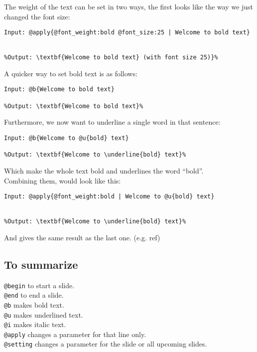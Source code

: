 The weight of the text can be set in two ways, the first looks like the way we just changed the font size: \\

\begin{lstlisting}[frame=single]
Input: @apply{@font_weight:bold @font_size:25 | Welcome to bold text}


%Output: \textbf{Welcome to bold text} (with font size 25)}%
\end{lstlisting}

A quicker way to set bold text is as follows: \\

\begin{lstlisting}[frame=single]
Input: @b{Welcome to bold text}

%Output: \textbf{Welcome to bold text}%
\end{lstlisting}
Furthermore, we now want to underline a single word in that sentence: \\

\begin{lstlisting}[frame=single]
Input: @b{Welcome to @u{bold} text}

%Output: \textbf{Welcome to \underline{bold} text}%
\end{lstlisting}
Which make the whole text bold and underlines the word ``bold''.\\

Combining them, would look like this:\\

\begin{lstlisting}[frame=single]
Input: @apply{@font_weight:bold | Welcome to @u{bold} text}


%Output: \textbf{Welcome to \underline{bold} text}%
\end{lstlisting}
And gives the same result as the last one. (e.g. ref)

\subsection*{To summarize}
\texttt{@begin} to start a slide. \\
\texttt{@end} to end a slide. \\
\texttt{@b} makes bold text. \\
\texttt{@u} makes underlined text. \\
\texttt{@i} makes italic text. \\
\texttt{@apply} changes a parameter for that line only. \\
\texttt{@setting} changes a parameter for the slide or all upcoming slides.\\

